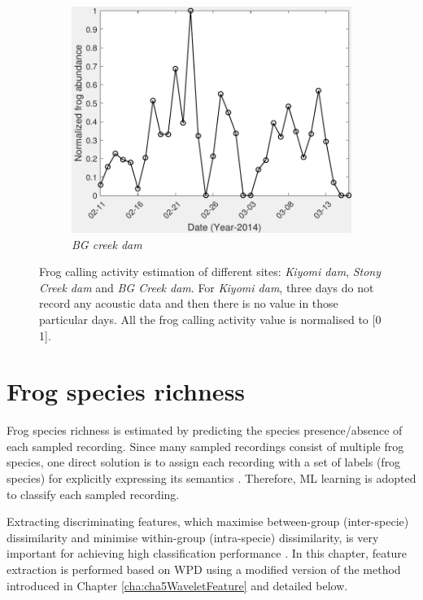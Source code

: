 \begin{figure}[htb!]
               ~
              \begin{subfigure}[b]{0.3\textwidth}
                \includegraphics[width=\textwidth]{image/Ch7/abundance1079.pdf}     
                \caption{\textit{BG creek dam}}           
        \end{subfigure}       
\caption[Frog calling activity detection of different sites]{Frog calling activity estimation of different sites: \textit{Kiyomi dam}, \textit{Stony Creek dam} and \textit{BG Creek dam}. For \textit{Kiyomi dam}, three days do not record any acoustic data and then there is no value in those particular days. All the frog calling activity value is normalised to [0 1].}
        \label{fig:frogAbundance}
\end{figure}




\section{Frog species richness}


Frog species richness is estimated by predicting the species presence/absence of each sampled recording. Since many sampled recordings consist of multiple frog species, one direct solution is to assign each recording with a set of labels (frog species) for explicitly expressing its semantics \citep{ZhangReview2014}. Therefore, ML learning is adopted to classify each sampled recording. 

Extracting discriminating features, which maximise between-group (inter-specie) dissimilarity
and minimise within-group (intra-specie) dissimilarity, is very important for achieving high classification performance \citep{huang2009frog, bedoya2014automatic}. In this chapter, feature extraction is performed based on WPD using a modified version of the method introduced in Chapter \ref{cha:cha5WaveletFeature} and detailed below. 

